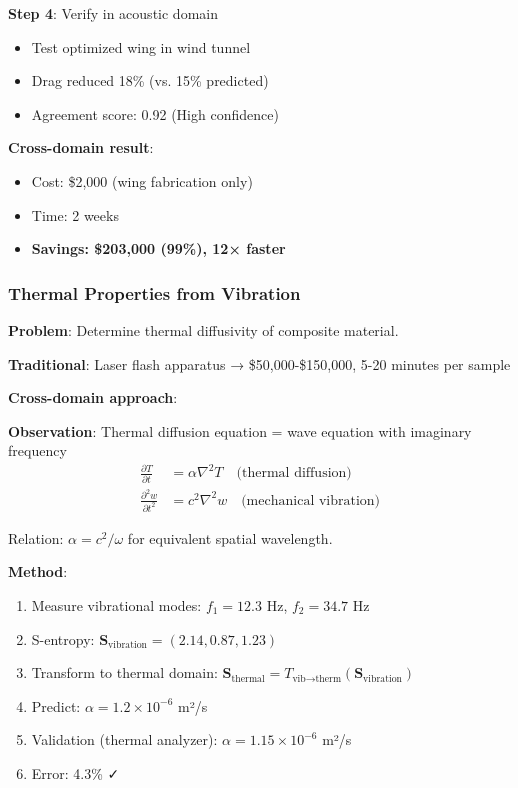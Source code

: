 \documentclass[12pt,a4paper]{article}
\begin{document}
\textbf{Step 4}: Verify in acoustic domain
\begin{itemize}
\item Test optimized wing in wind tunnel
\item Drag reduced 18\% (vs. 15\% predicted)
\item Agreement score: 0.92 (High confidence)
\end{itemize}

\textbf{Cross-domain result}:
\begin{itemize}
\item Cost: \$2,000 (wing fabrication only)
\item Time: 2 weeks
\item \textbf{Savings: \$203,000 (99\%), 12× faster}
\end{itemize}

\subsubsection{Thermal Properties from Vibration}

\textbf{Problem}: Determine thermal diffusivity of composite material.

\textbf{Traditional}: Laser flash apparatus → \$50,000-\$150,000, 5-20 minutes per sample

\textbf{Cross-domain approach}:

\textbf{Observation}: Thermal diffusion equation = wave equation with imaginary frequency
\begin{align}
\frac{\partial T}{\partial t} &= \alpha \nabla^2 T \quad \text{(thermal diffusion)} \\
\frac{\partial^2 w}{\partial t^2} &= c^2 \nabla^2 w \quad \text{(mechanical vibration)}
\end{align}

Relation: $\alpha = c^2 / \omega$ for equivalent spatial wavelength.

\textbf{Method}:
\begin{enumerate}
\item Measure vibrational modes: $f_1 = 12.3$ Hz, $f_2 = 34.7$ Hz
\item S-entropy: $\mathbf{S}_{\text{vibration}} = (2.14, 0.87, 1.23)$
\item Transform to thermal domain: $\mathbf{S}_{\text{thermal}} = T_{\text{vib→therm}}(\mathbf{S}_{\text{vibration}})$
\item Predict: $\alpha = 1.2 \times 10^{-6}$ m²/s
\item Validation (thermal analyzer): $\alpha = 1.15 \times 10^{-6}$ m²/s
\item Error: 4.3\% ✓
\end{enumerate}
\end{document}
